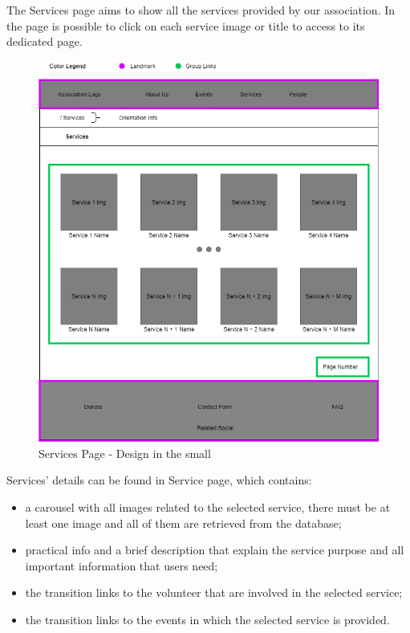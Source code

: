 The Services page aims to show all the services provided by our association. In the page is possible to click on each service image or title to access to its dedicated page.

\begin{figure}[h!]
		\centering
		\begin{minipage}[b]{1\textwidth}
    			\includegraphics[width=\textwidth]{./assets/services.png}
			\caption{Services Page - Design in the small}
		\end{minipage}
	\end{figure}
\FloatBarrier
\vspace{1cm}
\hspace{-1cm}
Services' details can be found in Service page, which contains:
\begin{itemize}
	\item a carousel with all images related to the selected service, there must be at least one image and all of them are retrieved 			from the database;
	\item practical info and a brief description that explain the service purpose and all important information that users need;
	\item the transition links to the volunteer that are involved in the selected service;
	\item the transition links to the events in which the selected service is provided.
\end{itemize} 

